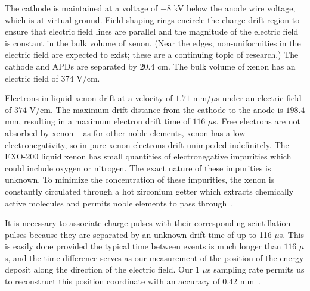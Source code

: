 The cathode is maintained at a voltage of $-8$ kV below the anode wire voltage, which is at virtual ground.  Field shaping rings encircle the charge drift region to ensure that electric field lines are parallel and the magnitude of the electric field is constant in the bulk volume of xenon.  (Near the edges, non-uniformities in the electric field are expected to exist; these are a continuing topic of research.)  The cathode and APDs are separated by $20.4$ cm. The bulk volume of xenon has an electric field of $374$ V/cm.

Electrons in liquid xenon drift at a velocity of $1.71$ mm/$\mu$s under an electric field of $374$ V/cm.  The maximum drift distance from the cathode to the anode is $198.4$ mm, resulting in a maximum electron drift time of $116$ $\mu$s.  Free electrons are not absorbed by xenon -- as for other noble elements, xenon has a low electronegativity, so in pure xenon electrons drift unimpeded indefinitely.  The EXO-200 liquid xenon has small quantities of electronegative impurities which could include oxygen or nitrogen.  The exact nature of these impurities is unknown.  To minimize the concentration of these impurities, the xenon is constantly circulated through a hot zirconium getter which extracts chemically active molecules and permits noble elements to pass through~\cite{detectorPartI}.

It is necessary to associate charge pulses with their corresponding scintillation pulses because they are separated by an unknown drift time of up to 116 $\mu$s.  This is easily done provided the typical time between events is much longer than $116$ $\mu$s, and the time difference serves as our measurement of the position of the energy deposit along the direction of the electric field.  Our 1 $\mu$s sampling rate permits us to reconstruct this position coordinate with an accuracy of $0.42$ mm~\cite{bb2nEXO2014}.

